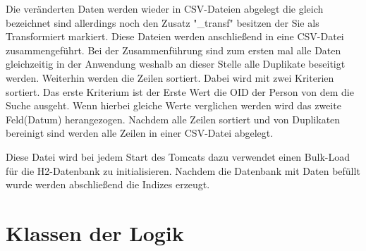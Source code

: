 Die veränderten Daten werden wieder in CSV-Dateien abgelegt die gleich bezeichnet sind allerdings noch den Zusatz "\_transf" besitzen der Sie als Transformiert  markiert. Diese Dateien werden anschließend in eine CSV-Datei zusammengeführt. Bei der Zusammenführung sind zum ersten mal alle Daten gleichzeitig in der Anwendung weshalb an dieser Stelle alle Duplikate beseitigt werden. Weiterhin werden die Zeilen sortiert. Dabei wird mit zwei Kriterien sortiert. Das erste Kriterium ist der Erste Wert die OID der Person von dem die Suche ausgeht. Wenn hierbei gleiche Werte verglichen werden wird das zweite Feld(Datum) herangezogen. Nachdem alle Zeilen sortiert und von Duplikaten bereinigt sind werden alle Zeilen in einer CSV-Datei abgelegt. 

Diese Datei wird bei jedem Start des Tomcats dazu verwendet einen Bulk-Load für die H2-Datenbank zu initialisieren. Nachdem die Datenbank mit Daten befüllt wurde werden abschließend die Indizes erzeugt.

\section{Klassen der Logik}



